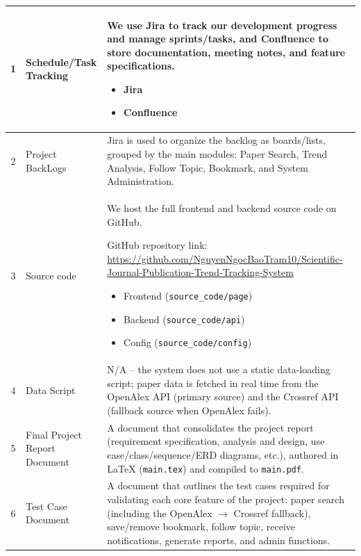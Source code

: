 \documentclass[12pt,a4paper]{article}
\begin{document}
{{\begin{table}[htbp]
\begin{tabularx}{\textwidth}{|c|L{3cm}|X|}
			1 & Schedule/Task Tracking &
			We use Jira to track our development progress and manage sprints/tasks, and Confluence to store documentation, meeting notes, and feature specifications.
			\begin{itemize}[leftmargin=*, itemsep=0pt, topsep=2pt]
				\item Jira
				\item Confluence
			\end{itemize} \\
			\hline
			
			2 & Project BackLogs &
			Jira is used to organize the backlog as boards/lists, grouped by the main modules: Paper Search, Trend Analysis, Follow Topic, Bookmark, and System Administration. \\
			\hline
			
			3 & Source code &
			We host the full frontend and backend source code on GitHub.
			
			GitHub repository link: \url{https://github.com/NguyenNgocBaoTram10/Scientific-Journal-Publication-Trend-Tracking-System}
			\begin{itemize}[leftmargin=*, itemsep=0pt, topsep=2pt]
				\item Frontend (\texttt{source\_code/page})
				\item Backend (\texttt{source\_code/api})
				\item Config (\texttt{source\_code/config})
			\end{itemize} \\
			\hline
			
			4 & Data Script &
			N/A -- the system does not use a static data-loading script; paper data is fetched in real time from the OpenAlex API (primary source) and the Crossref API (fallback source when OpenAlex fails). \\
			\hline
			
			5 & Final Project Report Document &
			A document that consolidates the project report (requirement specification, analysis and design, use case/class/sequence/ERD diagrams, etc.), authored in LaTeX (\texttt{main.tex}) and compiled to \texttt{main.pdf}. \\
			\hline
			
			6 & Test Case Document &
			A document that outlines the test cases required for validating each core feature of the project: paper search (including the OpenAlex $\rightarrow$ Crossref fallback), save/remove bookmark, follow topic, receive notifications, generate reports, and admin functions. \\
			\hline
			

\end{tabularx}
\end{table}}}
\end{document}
